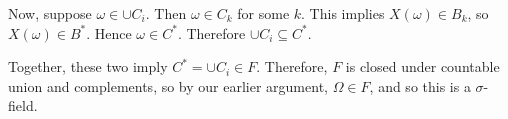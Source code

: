 \documentclass[10pt,letter]{article}
\begin{document}
Now, suppose $\omega \in \cup C_i$. Then $\omega \in C_k$ for some $k$. This implies $X(\omega) \in B_k$, so $X(\omega) \in B^*$. Hence $\omega \in C^*$. Therefore $\cup C_i \subseteq C^*$.

Together, these two imply $C^* = \cup C_i \in F$. Therefore, $F$ is closed under countable union and complements, so by our earlier argument, $\Omega \in F$, and so this is a $\sigma$-field.
\end{document}
